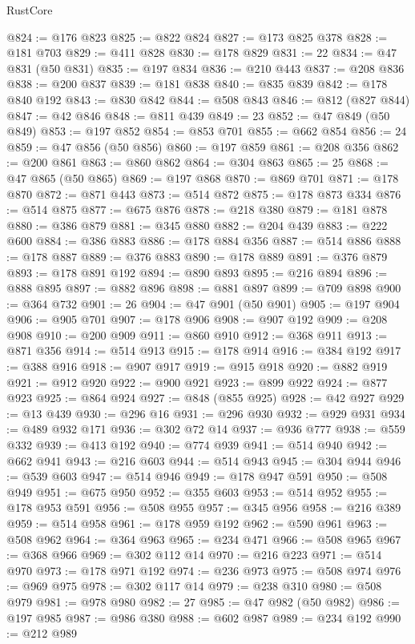 \begin{lexlean}{RustCore}
\begin{coremodule}
@824 := @176 @823
@825 := @822 @824
@827 := @173 @825 @378
@828 := @181 @703
@829 := @411 @828
@830 := @178 @829
@831 := 22
@834 := @47 @831 (@50 @831)
@835 := @197 @834
@836 := @210 @443
@837 := @208 @836
@838 := @200 @837
@839 := @181 @838
@840 := @835 @839
@842 := @178 @840 @192
@843 := @830 @842
@844 := @508 @843
@846 := @812 (@827 @844)
@847 := @42 @846
@848 := @811 @439
@849 := 23
@852 := @47 @849 (@50 @849)
@853 := @197 @852
@854 := @853 @701
@855 := @662 @854
@856 := 24
@859 := @47 @856 (@50 @856)
@860 := @197 @859
@861 := @208 @356
@862 := @200 @861
@863 := @860 @862
@864 := @304 @863
@865 := 25
@868 := @47 @865 (@50 @865)
@869 := @197 @868
@870 := @869 @701
@871 := @178 @870
@872 := @871 @443
@873 := @514 @872
@875 := @178 @873 @334
@876 := @514 @875
@877 := @675 @876
@878 := @218 @380
@879 := @181 @878
@880 := @386 @879
@881 := @345 @880
@882 := @204 @439
@883 := @222 @600
@884 := @386 @883
@886 := @178 @884 @356
@887 := @514 @886
@888 := @178 @887
@889 := @376 @883
@890 := @178 @889
@891 := @376 @879
@893 := @178 @891 @192
@894 := @890 @893
@895 := @216 @894
@896 := @888 @895
@897 := @882 @896
@898 := @881 @897
@899 := @709 @898
@900 := @364 @732
@901 := 26
@904 := @47 @901 (@50 @901)
@905 := @197 @904
@906 := @905 @701
@907 := @178 @906
@908 := @907 @192
@909 := @208 @908
@910 := @200 @909
@911 := @860 @910
@912 := @368 @911
@913 := @871 @356
@914 := @514 @913
@915 := @178 @914
@916 := @384 @192
@917 := @388 @916
@918 := @907 @917
@919 := @915 @918
@920 := @882 @919
@921 := @912 @920
@922 := @900 @921
@923 := @899 @922
@924 := @877 @923
@925 := @864 @924
@927 := @848 (@855 @925)
@928 := @42 @927
@929 := @13 @439
@930 := @296 @16
@931 := @296 @930
@932 := @929 @931
@934 := @489 @932 @171
@936 := @302 @72 @14
@937 := @936 @777
@938 := @559 @332
@939 := @413 @192
@940 := @774 @939
@941 := @514 @940
@942 := @662 @941
@943 := @216 @603
@944 := @514 @943
@945 := @304 @944
@946 := @539 @603
@947 := @514 @946
@949 := @178 @947 @591
@950 := @508 @949
@951 := @675 @950
@952 := @355 @603
@953 := @514 @952
@955 := @178 @953 @591
@956 := @508 @955
@957 := @345 @956
@958 := @216 @389
@959 := @514 @958
@961 := @178 @959 @192
@962 := @590 @961
@963 := @508 @962
@964 := @364 @963
@965 := @234 @471
@966 := @508 @965
@967 := @368 @966
@969 := @302 @112 @14
@970 := @216 @223
@971 := @514 @970
@973 := @178 @971 @192
@974 := @236 @973
@975 := @508 @974
@976 := @969 @975
@978 := @302 @117 @14
@979 := @238 @310
@980 := @508 @979
@981 := @978 @980
@982 := 27
@985 := @47 @982 (@50 @982)
@986 := @197 @985
@987 := @986 @380
@988 := @602 @987
@989 := @234 @192
@990 := @212 @989

\end{coremodule}
\end{lexlean}
